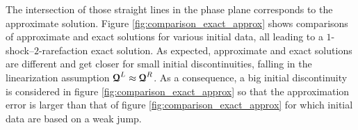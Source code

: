 The intersection of those straight lines in the phase plane corresponds to the approximate solution. Figure \ref{fig:comparison_exact_approx} shows comparisons of approximate and exact solutions for various initial data, all leading to a $1$-shock--$2$-rarefaction exact solution. As expected, approximate and exact solutions are different and get closer for small initial discontinuities, falling in the linearization assumption ${\boldsymbol{\mathcal{Q}}}^L\approx {\boldsymbol{\mathcal{Q}}}^R$. As a consequence, a big initial discontinuity is considered in figure \ref{fig:comparison_exact_approx} so that the approximation error is larger than that of figure \ref{fig:comparison_exact_approx} for which initial data are based on a weak jump.


